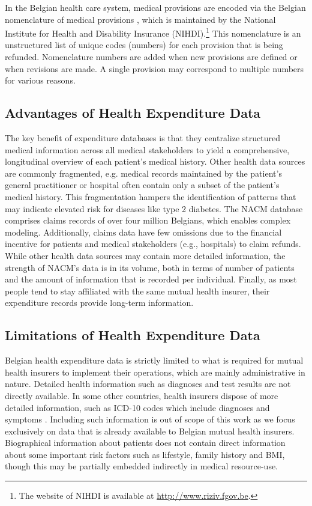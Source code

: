 In the Belgian health care system, medical provisions are encoded via the Belgian nomenclature of medical provisions \citep{van2008financing}, which is maintained by the National Institute for Health and Disability Insurance (NIHDI).\footnote{The website of NIHDI is available at \url{http://www.riziv.fgov.be}.} This nomenclature is an unstructured list of unique codes (numbers) for each provision that is being refunded. Nomenclature numbers are added when new provisions are defined or when revisions are made. A single provision may correspond to multiple numbers for various reasons.

\subsection{Advantages of Health Expenditure Data}
The key benefit of expenditure databases is that they centralize structured medical information across all medical stakeholders to yield a comprehensive, longitudinal overview of each patient's medical history. Other health data sources are commonly fragmented, e.g. medical records maintained by the patient's general practitioner or hospital often contain only a subset of the patient's medical history. This fragmentation hampers the identification of patterns that may indicate elevated risk for diseases like type 2 diabetes. The NACM database comprises claims records of over four million Belgians, which enables complex modeling. Additionally, claims data have few omissions due to the financial incentive for patients and medical stakeholders (e.g., hospitals) to claim refunds. While other health data sources may contain more detailed information, the strength of NACM's data is in its volume, both in terms of number of patients and the amount of information that is recorded per individual. Finally, as most people tend to stay affiliated with the same mutual health insurer, their expenditure records provide long-term information.

\subsection{Limitations of Health Expenditure Data}
Belgian health expenditure data is strictly limited to what is required for mutual health insurers to implement their operations, which are mainly administrative in nature. Detailed health information such as diagnoses and test results are not directly available. In some other countries, health insurers dispose of more detailed information, such as ICD-10 codes which include diagnoses and symptoms \citep{world2012international}. Including such information is out of scope of this work as we focus exclusively on data that is already available to Belgian mutual health insurers. Biographical information about patients does not contain direct information about some important risk factors such as lifestyle, family history and BMI, though this may be partially embedded indirectly in medical resource-use. %


